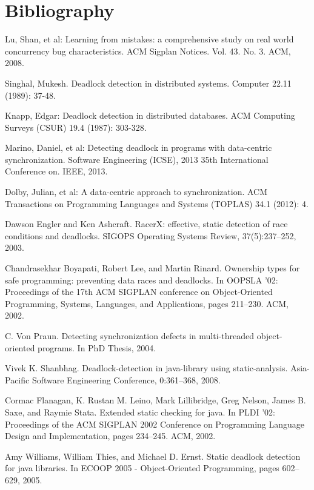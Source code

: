 \chapter{Bibliography}

\begin{thebibliography}{4}

 Lu, Shan, et al: Learning from mistakes: a comprehensive study on real world concurrency bug characteristics.
ACM Sigplan Notices. Vol. 43. No. 3. ACM, 2008.

 Singhal, Mukesh. Deadlock detection in distributed systems.
Computer 22.11 (1989): 37-48.

 Knapp, Edgar: Deadlock detection in distributed databases.
ACM Computing Surveys (CSUR) 19.4 (1987): 303-328.

 Marino, Daniel, et al: Detecting deadlock in programs with data-centric synchronization.
Software Engineering (ICSE), 2013 35th International Conference on. IEEE, 2013.

 Dolby, Julian, et al: A data-centric approach to synchronization.
ACM Transactions on Programming Languages and Systems (TOPLAS) 34.1 (2012): 4.

 Dawson Engler and Ken Ashcraft. RacerX: effective, static detection of race conditions and
deadlocks. SIGOPS Operating Systems Review, 37(5):237–252, 2003.

 Chandrasekhar Boyapati, Robert Lee, and Martin Rinard. Ownership types for safe programming:
preventing data races and deadlocks. In OOPSLA ’02: Proceedings of the 17th
ACM SIGPLAN conference on Object-Oriented Programming, Systems, Languages, and Applications,
pages 211–230. ACM, 2002.

 C. Von Praun. Detecting synchronization defects in multi-threaded object-oriented programs.
In PhD Thesis, 2004.

 Vivek K. Shanbhag. Deadlock-detection in java-library using static-analysis. Asia-Pacific
Software Engineering Conference, 0:361–368, 2008.

 Cormac Flanagan, K. Rustan M. Leino, Mark Lillibridge, Greg Nelson, James B. Saxe, and
Raymie Stata. Extended static checking for java. In PLDI ’02: Proceedings of the ACM
SIGPLAN 2002 Conference on Programming Language Design and Implementation, pages
234–245. ACM, 2002.

 Amy Williams, William Thies, and Michael D. Ernst. Static deadlock detection for java
libraries. In ECOOP 2005 - Object-Oriented Programming, pages 602–629, 2005.


\end{thebibliography}
